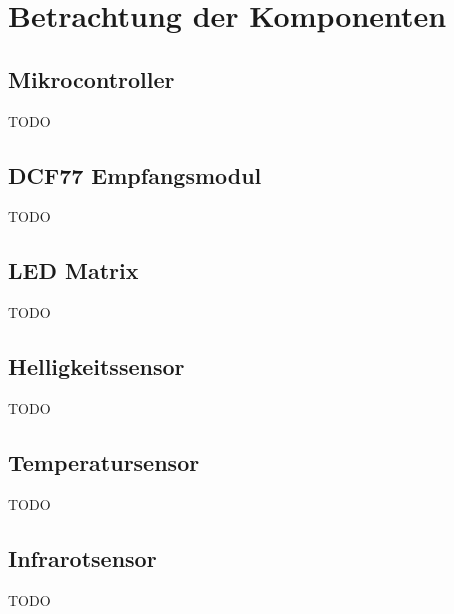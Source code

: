 \section{Betrachtung der Komponenten}
\subsection{Mikrocontroller}
TODO

\subsection{DCF77 Empfangsmodul}
TODO

\subsection{LED Matrix}
TODO

\subsection{Helligkeitssensor}
TODO

\subsection{Temperatursensor}
TODO

\subsection{Infrarotsensor}
TODO